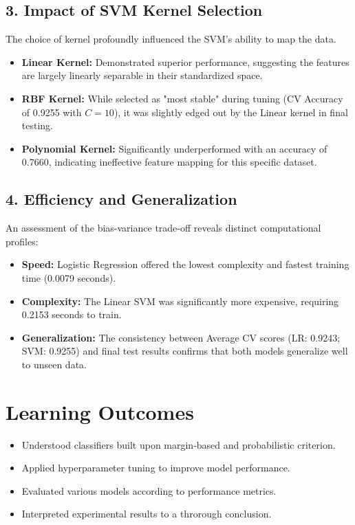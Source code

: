 \documentclass[11pt]{article}
\begin{document}
\subsection*{3. Impact of SVM Kernel Selection}
The choice of kernel profoundly influenced the SVM's ability to map the data.
\begin{itemize}
    \item \textbf{Linear Kernel:} Demonstrated superior performance, suggesting the features are largely linearly separable in their standardized space.
    \item \textbf{RBF Kernel:} While selected as "most stable" during tuning (CV Accuracy of 0.9255 with $C=10$), it was slightly edged out by the Linear kernel in final testing.
    \item \textbf{Polynomial Kernel:} Significantly underperformed with an accuracy of 0.7660, indicating ineffective feature mapping for this specific dataset.
\end{itemize}



\subsection*{4. Efficiency and Generalization}
An assessment of the bias-variance trade-off reveals distinct computational profiles:
\begin{itemize}
    \item \textbf{Speed:} Logistic Regression offered the lowest complexity and fastest training time (0.0079 seconds).
    \item \textbf{Complexity:} The Linear SVM was significantly more expensive, requiring 0.2153 seconds to train.
    \item \textbf{Generalization:} The consistency between Average CV scores (LR: 0.9243; SVM: 0.9255) and final test results confirms that both models generalize well to unseen data.
\end{itemize}



\section*{Learning Outcomes}
\begin{itemize}
    \item Understood classifiers built upon margin-based and probabilistic criterion.
    \item Applied hyperparameter tuning to improve model performance.
    \item Evaluated various models according to performance metrics.
    \item Interpreted experimental results to a throrough conclusion.
\end{itemize}
\end{document}
